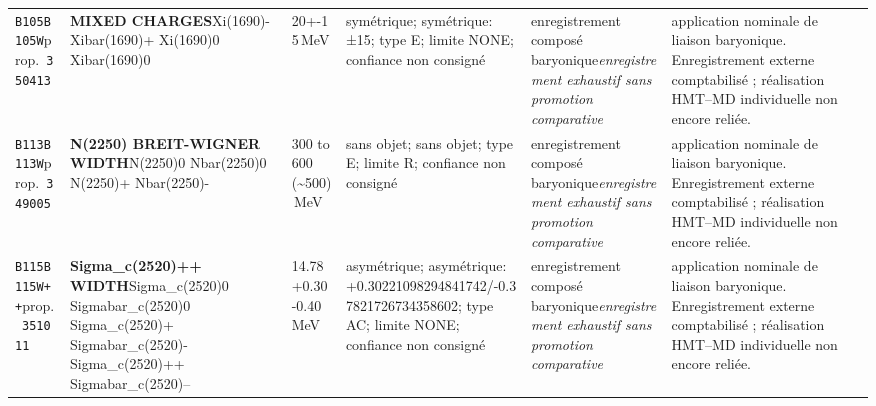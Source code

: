 \begin{landscape}
\begin{longtable}{L{1.85cm}L{4.45cm}L{2.35cm}L{4.05cm}L{3.35cm}L{7.15cm}}
\texttt{B105}\newline \texttt{B105W}\newline prop.\ \texttt{350413} & \textbf{MIXED CHARGES}\newline Xi(1690)- \textbar{}\allowbreak{} Xibar(1690)+ \textbar{}\allowbreak{} Xi(1690)0 \textbar{}\allowbreak{} Xibar(1690)0 & 20+-15\,MeV & symétrique; symétrique: ±15; type E; limite NONE; confiance non consigné & enregistrement composé baryonique\newline \emph{enregistrement exhaustif sans promotion comparative} & application nominale de liaison baryonique. Enregistrement externe comptabilisé ; réalisation HMT--MD individuelle non encore reliée. \\
\texttt{B113}\newline \texttt{B113W}\newline prop.\ \texttt{349005} & \textbf{N(2250) BREIT-WIGNER WIDTH}\newline N(2250)0 \textbar{}\allowbreak{} Nbar(2250)0 \textbar{}\allowbreak{} N(2250)+ \textbar{}\allowbreak{} Nbar(2250)- & 300 to 600 (\textasciitilde{}500)\,MeV & sans objet; sans objet; type E; limite R; confiance non consigné & enregistrement composé baryonique\newline \emph{enregistrement exhaustif sans promotion comparative} & application nominale de liaison baryonique. Enregistrement externe comptabilisé ; réalisation HMT--MD individuelle non encore reliée. \\
\texttt{B115}\newline \texttt{B115W++}\newline prop.\ \texttt{351011} & \textbf{Sigma\_\allowbreak{}c(2520)++ WIDTH}\newline Sigma\_\allowbreak{}c(2520)0 \textbar{}\allowbreak{} Sigmabar\_\allowbreak{}c(2520)0 \textbar{}\allowbreak{} Sigma\_\allowbreak{}c(2520)+ \textbar{}\allowbreak{} Sigmabar\_\allowbreak{}c(2520)- \textbar{}\allowbreak{} Sigma\_\allowbreak{}c(2520)++ \textbar{}\allowbreak{} Sigmabar\_\allowbreak{}c(2520)-- & 14.78+0.30-0.40\,MeV & asymétrique; asymétrique: +0.30221098294841742/-0.37821726734358602; type AC; limite NONE; confiance non consigné & enregistrement composé baryonique\newline \emph{enregistrement exhaustif sans promotion comparative} & application nominale de liaison baryonique. Enregistrement externe comptabilisé ; réalisation HMT--MD individuelle non encore reliée. \\

\end{longtable}
\end{landscape}
